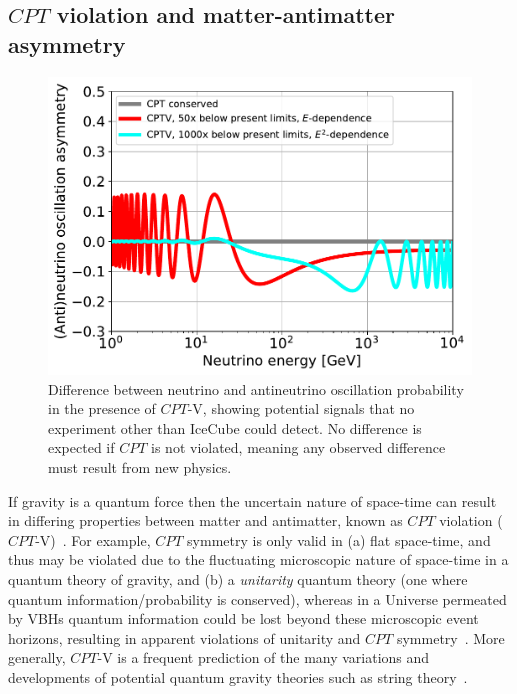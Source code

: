 \documentclass[a4paper,11pt]{article}
\begin{document}
\subsection{$CPT$ violation and matter-antimatter asymmetry}


\begin{figure} %
    \centering
    \includegraphics[trim=0.0cm 0.0cm 0.cm 0.0cm, clip=true, width=1.\linewidth]{images/CPTv_IceCube.pdf}
	\caption{Difference between neutrino and antineutrino oscillation probability in the presence of $CPT$-V, showing potential signals that no experiment other than IceCube could detect. No difference is expected if $CPT$ is not violated, meaning any observed difference must result from new physics. }
	\label{fig:$CPT$v}
\end{figure}

If gravity is a quantum force then the uncertain nature of space-time can result in differing properties between matter and antimatter, known as $CPT$ violation ($CPT$-V)~\cite{Mavromatos:2005mi, AmelinoCamelia:2008qg, RalfLehnert:2016grl}. For example, $CPT$ symmetry is only valid in (a) flat space-time, and thus may be violated due to the fluctuating microscopic nature of  space-time in a quantum theory of gravity, and (b) a \textit{unitarity} quantum theory (one where quantum information/probability is conserved), whereas in a Universe permeated by VBHs quantum information could be lost beyond these microscopic event horizons, resulting in apparent violations of unitarity and $CPT$ symmetry~\cite{Mavromatos:2005mi}. More generally, $CPT$-V is a frequent prediction of the many variations and developments of potential quantum gravity theories such as string theory~\cite{Mavromatos:2005mi, Hashimoto:2014aoa, Ellis:2013gca}.
\end{document}
